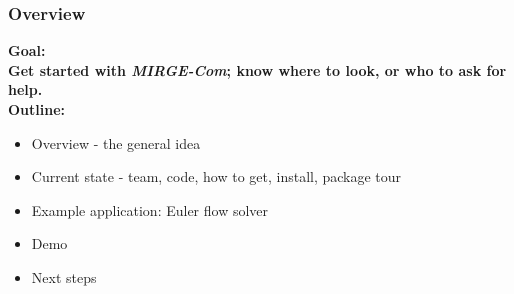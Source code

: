 \begin{frame}\frametitle{Overview}
\vspace*{0.1in}
\bfseries{\color{myOrange} Goal}:\\
Get started with \textit{MIRGE-Com}; know where to look, or who to ask for help.\\
\vspace{0.2in}
\bfseries{\color{myOrange} Outline}:\\
\begin{multicols}{2}
\begin{itemize}
  \item Overview - the general idea
  \item Current state - team, code, how to get, install, package tour
  \item Example application: Euler flow solver
  \item Demo
  \item Next steps
\end{itemize}
\end{multicols}
\end{frame}

